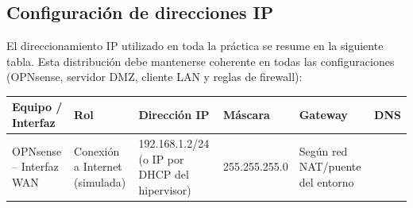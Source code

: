 \documentclass{article}
\renewcommand{\_}{\oldunderscore\hskip0pt\relax}
\begin{document}
\hypertarget{configuraciuxf3n-de-direcciones-ip}{%
\subsection{Configuración de direcciones
IP}\label{configuraciuxf3n-de-direcciones-ip}}

El direccionamiento IP utilizado en toda la práctica se resume en la
siguiente tabla. Esta distribución debe mantenerse coherente en todas
las configuraciones (OPNsense, servidor DMZ, cliente LAN y reglas de
firewall):

{\small\setlength{\tabcolsep}{2pt}\begin{longtable}[]{@{}llllll@{}}
\toprule
\begin{minipage}[b]{0.168\columnwidth}\raggedright
Equipo / Interfaz\strut
\end{minipage} & \begin{minipage}[b]{0.143\columnwidth}\raggedright
Rol\strut
\end{minipage} & \begin{minipage}[b]{0.151\columnwidth}\raggedright
Dirección IP\strut
\end{minipage} & \begin{minipage}[b]{0.155\columnwidth}\raggedright
Máscara\strut
\end{minipage} & \begin{minipage}[b]{0.134\columnwidth}\raggedright
Gateway\strut
\end{minipage} & \begin{minipage}[b]{0.118\columnwidth}\raggedright
DNS\strut
\end{minipage}\tabularnewline
\midrule
\endhead
\begin{minipage}[t]{0.168\columnwidth}\raggedright
OPNsense -- Interfaz WAN\strut
\end{minipage} & \begin{minipage}[t]{0.143\columnwidth}\raggedright
Conexión a Internet (simulada)\strut
\end{minipage} & \begin{minipage}[t]{0.151\columnwidth}\raggedright
192.168.1.2/24 (o IP por DHCP del hipervisor)\strut
\end{minipage} & \begin{minipage}[t]{0.155\columnwidth}\raggedright
255.255.255.0\strut
\end{minipage} & \begin{minipage}[t]{0.134\columnwidth}\raggedright
Según red NAT/puente del entorno\strut
\end{minipage} & \begin{minipage}[t]{0.118\columnwidth}\raggedright

\end{minipage}
\end{longtable}}
\end{document}
